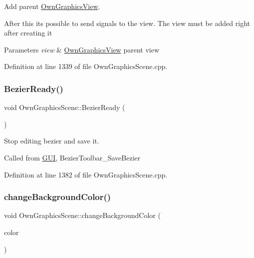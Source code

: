 Add parent \mbox{\hyperlink{classOwnGraphicsView}{Own\+Graphics\+View}}. 

After this it\textquotesingle{}s possible to send signals to the view. The view must be added right after creating it 
\begin{DoxyParams}{Parameters}
{\em view} & \mbox{\hyperlink{classOwnGraphicsView}{Own\+Graphics\+View}} parent view \\
\hline
\end{DoxyParams}


Definition at line 1339 of file Own\+Graphics\+Scene.\+cpp.

\mbox{\label{classOwnGraphicsScene_a0417f4637137fc3ef7004a7b6eeb6a39}} 
\subsubsection{\texorpdfstring{Bezier\+Ready()}{BezierReady()}}
{\footnotesize\ttfamily void Own\+Graphics\+Scene\+::\+Bezier\+Ready (\begin{DoxyParamCaption}{ }\end{DoxyParamCaption})}



Stop editing bezier and save it. 

Called from \mbox{\hyperlink{classGUI}{G\+UI}}, Bezier\+Toolbar\+\_\+\+Save\+Bezier 

Definition at line 1382 of file Own\+Graphics\+Scene.\+cpp.

\mbox{\label{classOwnGraphicsScene_abf700184c967b526194bfab096396850}} 
\subsubsection{\texorpdfstring{change\+Background\+Color()}{changeBackgroundColor()}}
{\footnotesize\ttfamily void Own\+Graphics\+Scene\+::change\+Background\+Color (\begin{DoxyParamCaption}\item[{const Q\+Color \&}]{color }\end{DoxyParamCaption})}




